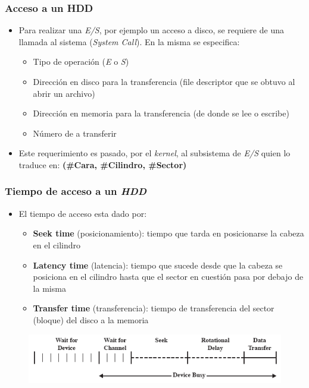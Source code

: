 \begin{frame}
  \frametitle{Acceso a un \textbf{HDD}}
  \begin{itemize}
    \item Para realizar una \emph{E/S}, por ejemplo un acceso a disco, se requiere de una llamada al sistema (\textit{System Call}). En la misma se especifica:
    \begin{itemize}
      \item Tipo de operación (\emph{E} o \emph{S})
      \item Dirección en disco para la transferencia (file descriptor que se obtuvo al abrir un archivo)
      \item Dirección en memoria para la transferencia (de donde se lee o escribe)
      \item Número de \bytes \hspace{1pt} a transferir
    \end{itemize}
    \item Este requerimiento es pasado, por el \textit{kernel}, al subsistema de \emph{E/S} quien lo traduce en: \textbf{(\#Cara, \#Cilindro, \#Sector)}
  \end{itemize}
\end{frame}

\begin{frame}
  \frametitle{Tiempo de acceso a un \textit{HDD}}
  \begin{itemize}
    \item El tiempo de acceso esta dado por:
    \begin{itemize}
      \item \textbf{Seek time} (posicionamiento): tiempo que tarda en posicionarse la cabeza en el cilindro 
      \item \textbf{Latency time} (latencia): tiempo que sucede desde que la cabeza se posiciona en el cilindro hasta que el sector en cuestión pasa por debajo de la misma
      \item \textbf{Transfer time} (transferencia): tiempo de transferencia del sector (bloque) del disco a la memoria
    \end{itemize}    
  \end{itemize}
  \begin{figure}
      \includegraphics[scale=0.4]{images/dat.png}
  \end{figure}
\end{frame}

